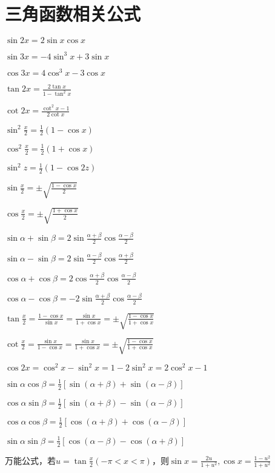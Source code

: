 \section{三角函数相关公式}

\begin{spacing}{\hangju}
    \begin{multicols}{2}
        \noindent $\sin{2x}=2\sin{x}\cos{x}$

        \noindent $\sin{3x}=-4\sin^3{x}+3\sin{x}$

        \noindent $\cos{3x}=4\cos^3{x}-3\cos{x}$

        \noindent $\tan{2x}=\frac{2\tan{x}}{1-\tan^2{x}}$

        \noindent $\cot{2x}=\frac{\cot^2{x}-1}{2\cot{x}}$

        \noindent $\sin^2{\frac{x}{2}}=\frac{1}{2}(1-\cos{x})$

        \noindent $\cos^2{\frac{x}{2}}=\frac{1}{2}(1+\cos{x})$

        \noindent $\sin^2{z}=\frac{1}{2}(1-\cos{2z})$

        \noindent $\sin{\frac{x}{2}}=\pm\sqrt{\frac{1-\cos{x}}{2}}$

        \noindent $\cos{\frac{x}{2}}=\pm\sqrt{\frac{1+\cos{x}}{2}}$

        \noindent $\sin{\alpha}+\sin{\beta}=2\sin{\frac{\alpha+\beta}{2}}\cos{\frac{\alpha-\beta}{2}}$

        \noindent $\sin{\alpha}-\sin{\beta}=2\sin{\frac{\alpha-\beta}{2}}\cos{\frac{\alpha+\beta}{2}}$

        \noindent $\cos{\alpha}+\cos{\beta}=2\cos{\frac{\alpha+\beta}{2}}\cos{\frac{\alpha-\beta}{2}}$

        \noindent $\cos{\alpha}-\cos{\beta}=-2\sin{\frac{\alpha+\beta}{2}}\cos{\frac{\alpha-\beta}{2}}$

    \end{multicols}

    \noindent $\tan{\frac{x}{2}}=\frac{1-\cos{x}}{\sin{x}}=\frac{\sin{x}}{1+\cos{x}}=\pm\sqrt{\frac{1-\cos{x}}{1+\cos{x}}}$

    \noindent $\cot{\frac{x}{2}}=\frac{\sin{x}}{1-\cos{x}}=\frac{\sin{x}}{1+\cos{x}}=\pm\sqrt{\frac{1-\cos{x}}{1+\cos{x}}}$

    \noindent $\cos{2x}=\cos^2{x}-\sin^2{x}=1-2\sin^2{x}=2\cos^2{x}-1$

    \noindent $\sin{\alpha}\cos{\beta}=\frac{1}{2}[\sin{(\alpha+\beta)}+\sin{(\alpha-\beta)}]$

    \noindent $\cos{\alpha}\sin{\beta}=\frac{1}{2}[\sin{(\alpha+\beta)}-\sin{(\alpha-\beta)}]$

    \noindent $\cos{\alpha}\cos{\beta}=\frac{1}{2}[\cos{(\alpha+\beta)}+\cos{(\alpha-\beta)}]$

    \noindent $\sin{\alpha}\sin{\beta}=\frac{1}{2}[\cos{(\alpha-\beta)}-\cos{(\alpha+\beta)}]$

    \noindent $\mbox{万能公式，若}u=\tan{\frac{x}{2}}(-\pi<x<\pi)\mbox{，则}\sin{x}=\frac{2u}{1+u^2}, \cos{x}=\frac{1-u^2}{1+u^2}$

\end{spacing}